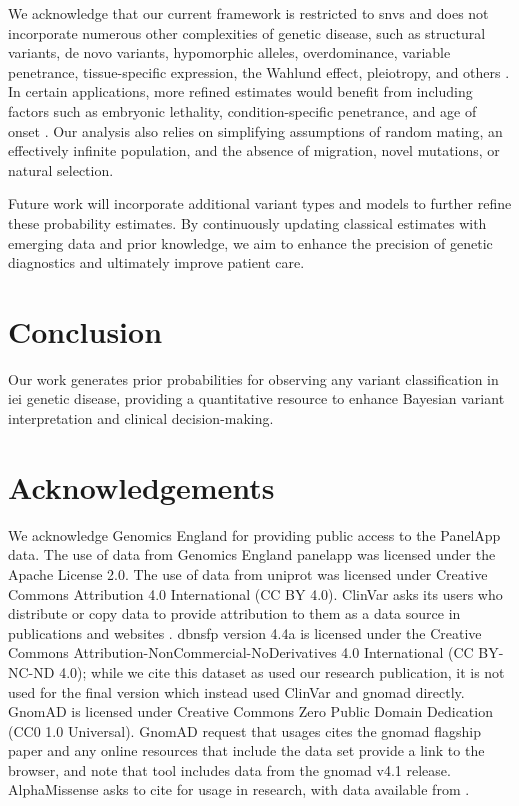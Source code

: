 We acknowledge that our current framework is restricted to \ac{snv}s and does not incorporate numerous other complexities of genetic disease, such as structural variants, de novo variants, hypomorphic alleles, overdominance, variable penetrance, tissue-specific expression, the Wahlund effect, pleiotropy, and others \cite{zschocke_mendelian_2023}. In certain applications, more refined estimates would benefit from including factors such as embryonic lethality, condition-specific penetrance, and age of onset \cite{hannah_using_2024}. Our analysis also relies on simplifying assumptions of random mating, an effectively infinite population, and the absence of migration, novel mutations, or natural selection.

Future work will incorporate additional variant types and models to further refine these probability estimates. By continuously updating classical estimates with emerging data and prior knowledge, we aim to enhance the precision of genetic diagnostics and ultimately improve patient care.

\section{Conclusion}
Our work generates prior probabilities for observing any variant classification in \ac{iei} genetic disease, providing a quantitative resource to enhance Bayesian variant interpretation and clinical decision-making.

\section*{Acknowledgements}
\noindent
We acknowledge Genomics England for providing public access to the PanelApp data.
The use of data from Genomics England panelapp was licensed under the Apache License 2.0.
The use of data from \ac{uniprot} was licensed under Creative Commons Attribution 4.0 International (CC BY 4.0).
ClinVar asks its users who distribute or copy data to provide attribution to them as a data source in publications and websites \cite{landrum_clinvar_2018}.
\ac{dbnsfp} version 4.4a is licensed under the Creative Commons Attribution-NonCommercial-NoDerivatives 4.0 International (CC BY-NC-ND 4.0); while we cite this dataset as used our research publication, it is not used for the final version which instead used ClinVar and \ac{gnomad} directly.
GnomAD is licensed under  Creative Commons  Zero Public Domain Dedication (CC0 1.0 Universal).
GnomAD request that usages cites the \ac{gnomad} flagship paper \cite{karczewski2020mutational}
and any online resources that include the data set provide a link to the browser, and note that tool includes data from the \ac{gnomad} v4.1 release.
AlphaMissense asks to cite \citet{cheng_accurate_2023} for usage in research, with data available from \citet{jun_cheng_2023_8208688}.

